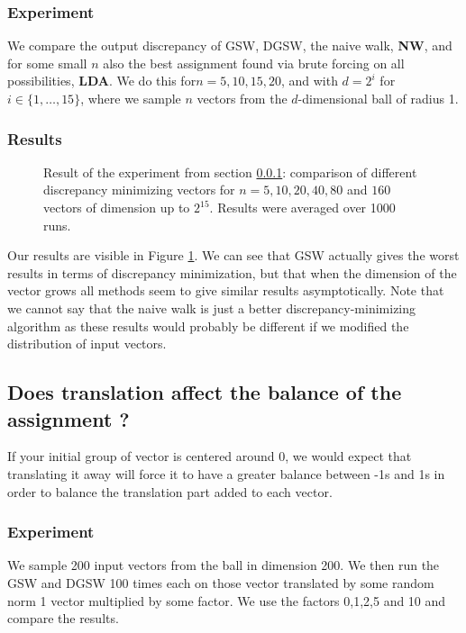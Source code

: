 \documentclass[12pt]{article}
\begin{document}
\subsubsection{Experiment}\label{how_good_at_minimizing_disc}
We compare the output discrepancy of GSW, DGSW, the naive walk, \textbf{NW}, and for some small $n$ also the best assignment found via brute forcing on all possibilities, \textbf{LDA}. We do this for$n=5,10,15,20$, and with $d=2^i$ for $i\in\{1,\dots,15\}$, where we sample $n$ vectors from the $d$-dimensional ball of radius 1.

\subsubsection{Results}
\begin{figure}
\centering

\caption{Result of the experiment from section \ref{how_good_at_minimizing_disc}: comparison of different discrepancy minimizing vectors for $n=5,10,20,40,80$ and $160$ vectors of dimension up to $2^{15}$. Results were averaged over 1000 runs.}\label{output_disc}
\end{figure}
Our results are visible in Figure \ref{output_disc}. We can see that GSW actually gives the worst results in terms of discrepancy minimization, but that when the dimension of the vector grows all methods seem to give similar results asymptotically. Note that we cannot say that the naive walk is just a better discrepancy-minimizing algorithm as these results would probably be different if we modified the distribution of input vectors.

\subsection{Does translation affect the balance of the assignment ?}\label{trans_balance}
If your initial group of vector is centered around 0, we would expect that translating it away will force it to have a greater balance between -1s and 1s in order to balance the translation part added to each vector.

\subsubsection{Experiment}
We sample 200 input vectors from the ball in dimension 200. We then run the GSW and DGSW 100 times each on those vector translated by some random norm 1 vector multiplied by some factor. We use the factors 0,1,2,5 and 10 and compare the results.
\end{document}
